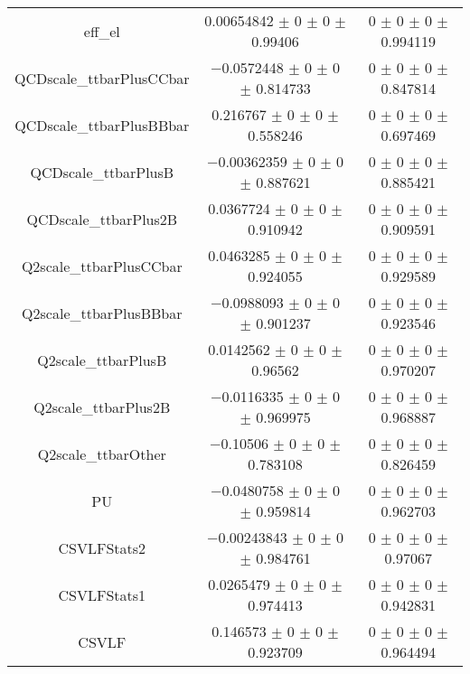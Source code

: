\begin{table}
\begin{tabular}{ccc}
eff\_el 	& \num{0.00654842} $\pm$ \num{0} $\pm$ \num{0} $\pm$ \num{0.99406} 	& \num{0} $\pm$ \num{0} $\pm$ \num{0} $\pm$ \num{0.994119}\\
QCDscale\_ttbarPlusCCbar 	& \num{-0.0572448} $\pm$ \num{0} $\pm$ \num{0} $\pm$ \num{0.814733} 	& \num{0} $\pm$ \num{0} $\pm$ \num{0} $\pm$ \num{0.847814}\\
QCDscale\_ttbarPlusBBbar 	& \num{0.216767} $\pm$ \num{0} $\pm$ \num{0} $\pm$ \num{0.558246} 	& \num{0} $\pm$ \num{0} $\pm$ \num{0} $\pm$ \num{0.697469}\\
QCDscale\_ttbarPlusB 	& \num{-0.00362359} $\pm$ \num{0} $\pm$ \num{0} $\pm$ \num{0.887621} 	& \num{0} $\pm$ \num{0} $\pm$ \num{0} $\pm$ \num{0.885421}\\
QCDscale\_ttbarPlus2B 	& \num{0.0367724} $\pm$ \num{0} $\pm$ \num{0} $\pm$ \num{0.910942} 	& \num{0} $\pm$ \num{0} $\pm$ \num{0} $\pm$ \num{0.909591}\\
Q2scale\_ttbarPlusCCbar 	& \num{0.0463285} $\pm$ \num{0} $\pm$ \num{0} $\pm$ \num{0.924055} 	& \num{0} $\pm$ \num{0} $\pm$ \num{0} $\pm$ \num{0.929589}\\
Q2scale\_ttbarPlusBBbar 	& \num{-0.0988093} $\pm$ \num{0} $\pm$ \num{0} $\pm$ \num{0.901237} 	& \num{0} $\pm$ \num{0} $\pm$ \num{0} $\pm$ \num{0.923546}\\
Q2scale\_ttbarPlusB 	& \num{0.0142562} $\pm$ \num{0} $\pm$ \num{0} $\pm$ \num{0.96562} 	& \num{0} $\pm$ \num{0} $\pm$ \num{0} $\pm$ \num{0.970207}\\
Q2scale\_ttbarPlus2B 	& \num{-0.0116335} $\pm$ \num{0} $\pm$ \num{0} $\pm$ \num{0.969975} 	& \num{0} $\pm$ \num{0} $\pm$ \num{0} $\pm$ \num{0.968887}\\
Q2scale\_ttbarOther 	& \num{-0.10506} $\pm$ \num{0} $\pm$ \num{0} $\pm$ \num{0.783108} 	& \num{0} $\pm$ \num{0} $\pm$ \num{0} $\pm$ \num{0.826459}\\
PU 	& \num{-0.0480758} $\pm$ \num{0} $\pm$ \num{0} $\pm$ \num{0.959814} 	& \num{0} $\pm$ \num{0} $\pm$ \num{0} $\pm$ \num{0.962703}\\
CSVLFStats2 	& \num{-0.00243843} $\pm$ \num{0} $\pm$ \num{0} $\pm$ \num{0.984761} 	& \num{0} $\pm$ \num{0} $\pm$ \num{0} $\pm$ \num{0.97067}\\
CSVLFStats1 	& \num{0.0265479} $\pm$ \num{0} $\pm$ \num{0} $\pm$ \num{0.974413} 	& \num{0} $\pm$ \num{0} $\pm$ \num{0} $\pm$ \num{0.942831}\\
CSVLF 	& \num{0.146573} $\pm$ \num{0} $\pm$ \num{0} $\pm$ \num{0.923709} 	& \num{0} $\pm$ \num{0} $\pm$ \num{0} $\pm$ \num{0.964494}\\

\end{tabular}
\end{table}
